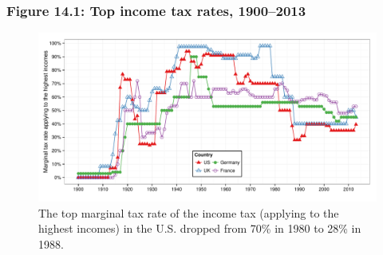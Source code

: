 \documentclass[t]{beamer}\usepackage[]{graphicx}\usepackage[]{color}
\newenvironment{knitrout}{}{} %
\begin{document}
\begin{frame}[label=Figure141]
\frametitle{Figure 14.1: Top income tax rates, 1900--2013}
\begin{figure}[t]
\begin{minipage}[b]{\textwidth}
\centering
\begin{knitrout}\footnotesize
{}\color{fgcolor}

{\centering \includegraphics[width=1\linewidth]{figures/color/Figure_14_1} 

}



\end{knitrout}
\caption{The top marginal tax rate of the income tax (applying to the highest incomes) in the U.S. dropped from 70\% in 1980 to 28\% in 1988.}
\end{minipage}
\end{figure}
\end{frame}
\end{document}
